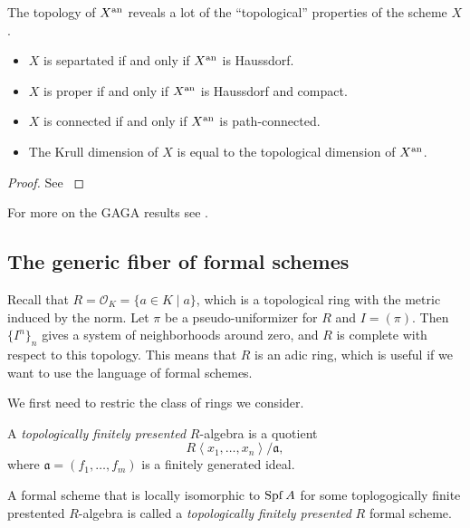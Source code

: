 \begin{theorem}
	The topology of $X{}^{\text{an}}$ reveals a lot of the ``topological'' properties of the scheme $X$. 
	\begin{itemize}
		\item $X$ is separtated if and only if $X{}^{\text{an}}$ is Haussdorf. 
		\item $X$ is proper if and only if $X{}^{\text{an}}$ is Haussdorf and compact. 
		\item  $X$ is connected if and only if $X{}^{\text{an}}$ is path-connected. 
		\item The Krull dimension of  $X$ is equal to the topological dimension of $X{}^{\text{an}}$. 
	\end{itemize}
\end{theorem}
\begin{proof}
	See \cite[][thm.\ 3.4.8]{berkovichSpectralTheoryAnalytic2012}
\end{proof}

For more on the GAGA results see \cite[][sec.\ 3.4]{berkovichSpectralTheoryAnalytic2012}.


\subsection{The generic fiber of formal schemes} \label{sec:the_generic_fiber_of_formal_schemes}

Recall that $R = \mathcal{O}_K = \{a \in K \mid a\} $, which is a topological ring with the metric induced by the norm. 
Let $\pi$ be a pseudo-uniformizer for $R$ and $I = (\pi)$. 
Then $\{I^{n}\}_n$ gives a system of neighborhoods around zero, and $R$ is complete with respect to this topology. 
This means that $R$ is an adic ring, which is useful if we want to use the language of formal schemes. 

We first need to restric the class of rings we consider. 

\begin{definition}\label{def:topologically_finite_presentation_algebra}
	A \emph{topologically finitely presented} $R$-algebra is a quotient \[
		R\left<x_1, \ldots, x_n \right> / \mathfrak{a} 
	,\] where $\mathfrak{a}  = (f_1, \ldots, f_m)$ is a finitely generated ideal. 

	A formal scheme that is locally isomorphic to $\operatorname{Spf} A$ for some toplogogically finite prestented $R$-algebra is called a \emph{topologically finitely presented} $R$ formal scheme. 
\end{definition}

